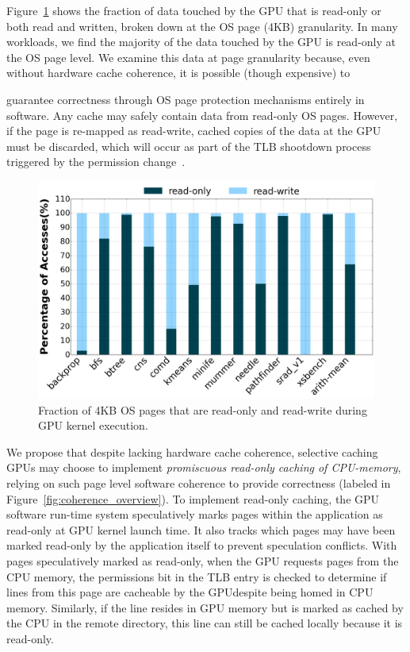 Figure~\ref{fig:readonlymotivation} shows the fraction of data touched by the 
GPU that is read-only or both read and written, broken down at 
the OS page (4KB) granularity.  In many workloads, we find the majority 
of the data touched by the GPU is read-only at the OS page level.  We
examine this data at page granularity because, even without hardware 
cache coherence, it is possible (though expensive) to
guarantee correctness through OS page 
protection mechanisms entirely in software. 
Any cache may safely contain data from read-only OS pages.
However, if the page is re-mapped as read-write, cached copies
of the data at the GPU must be discarded, which will occur as part
of the TLB shootdown process triggered by the permission change~\cite{stenstrom1990}.

\begin{figure}[tp]
\centering
\includegraphics[width=1.0\columnwidth]{hpca2016/figures/read-only.png}
\caption{Fraction of 4KB OS pages that are read-only and read-write
during GPU kernel execution.}
\label{fig:readonlymotivation}
\end{figure}

We propose that despite lacking hardware cache coherence, selective caching GPUs may choose to implement 
\textit{promiscuous read-only caching of CPU-memory}, relying on such page level software coherence 
to provide correctness (labeled  in Figure~\ref{fig:coherence_overview}).  To implement read-only caching, the GPU software 
run-time system speculatively marks pages within the application as 
read-only at GPU kernel launch time.  It also tracks which pages may have been marked
read-only by the application itself to prevent speculation conflicts.  With pages speculatively
marked as read-only, when the GPU requests pages from the CPU memory, the permissions 
bit in the TLB entry is checked to determine if lines from this page are cacheable by the 
GPU\@ despite being homed in CPU memory. Similarly, if the line resides in GPU memory but is marked as cached by
the CPU in the remote directory, this line can still be cached locally because it is read-only.

